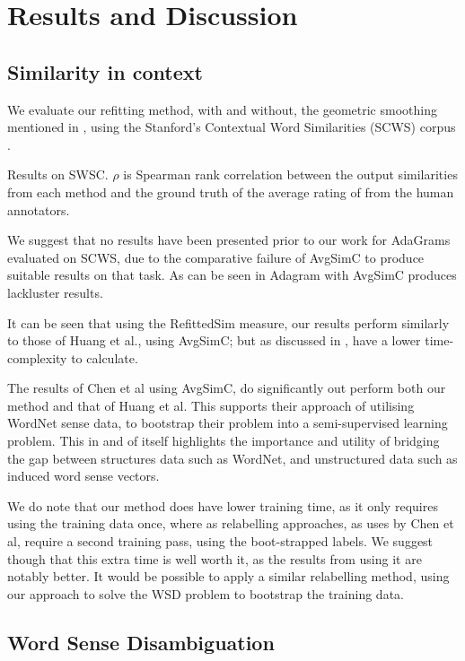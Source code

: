 \documentclass{sig-alternate}
\begin{document}
\section{Results and Discussion} \label{results}


\subsection{Similarity in context}

We evaluate our refitting method, with and without, the geometric smoothing mentioned in , using the Stanford's Contextual Word Similarities (SCWS) corpus \parencite{Huang2012}.

\begin{table*}

\caption{Results on SWSC. $\rho$ is Spearman rank correlation between the output similarities from each method and the ground truth of the average rating of from the human annotators. } \label{swscres}
\end{table*}


We suggest that no results have been presented prior to our work for AdaGrams evaluated on SCWS,
due to the comparative failure of AvgSimC to produce suitable results on that task. As can be seen in  Adagram with AvgSimC produces lackluster results. 

It can be seen that using the RefittedSim measure, our results perform similarly to those of Huang et al., using AvgSimC; but as discussed in , have a lower time-complexity to calculate.


The results of Chen et al using AvgSimC, do significantly out perform both our method and that of Huang et al. This supports their approach of utilising WordNet sense data, to bootstrap their problem into a semi-supervised learning problem. This in and of itself highlights the importance and utility of bridging the gap between structures data such as WordNet, and unstructured data such as induced word sense vectors.

We do note that our method does have lower training time, as it only requires using the training data once, where as relabelling approaches, as uses by Chen et al, require a second training pass, using the boot-strapped labels. We suggest though that this extra time is well worth it, as the results from using it are notably better. It would be possible to apply a similar relabelling method, using our approach to solve the WSD problem to bootstrap the training data.

\subsection{Word Sense Disambiguation}


\printbibliography
\end{document}
